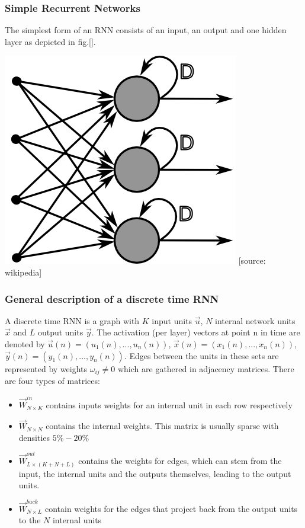 \subsubsection*{Simple Recurrent Networks}
The simplest form of an RNN consists of an input, an output and one hidden layer as depicted in fig.[]. 

\includegraphics[width=.7\textwidth]{./img/simple_rnn.png}
[source: wikipedia]

\subsubsection*{General description of a discrete time RNN}
A discrete time RNN is a graph with $K$ input units $\vec{u}$, $N$ internal network units $\vec{x}$ and $L$ output units $\vec{y}$. The activation (per layer) vectors at point n in time are denoted by $\vec{u}(n) = (u_1(n),...,u_n(n))$, $\vec{x}(n) = (x_1(n),...,x_n(n))$, $\vec{y}(n) = (y_1(n),...,y_n(n))$. Edges between the units in these sets are represented by weights $\omega_{ij}\neq0$ which are gathered in adjacency matrices. There are four types of matrices:\par
\begin{itemize}
	\item $\vec{W}^{in}_{N\times K}$ contains inputs weights for an internal unit in each row respectively 
	\item $\vec{W}_{N\times N}$ contains the internal weights. This matrix is usually sparse with densities $5\%-20\%$
	\item $\vec{W}^{out}_{L\times (K+N+L)}$ contains the weights for edges, which can stem from the input, the internal units and the outputs themselves, leading to the output units.
	\item $\vec{W}^{back}_{N\times L}$ contain weights for the edges that project back from the output units to the $N$ internal units
\end{itemize}

